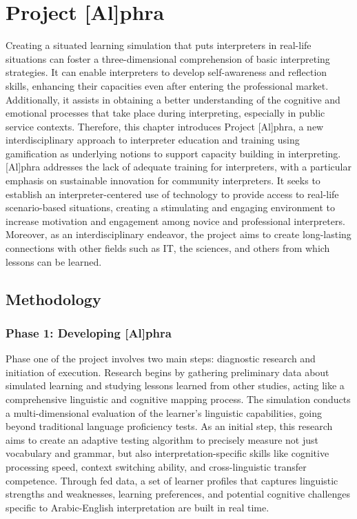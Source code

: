 \documentclass[output=paper]{langscibook}
\begin{document}
\section{Project [Al]phra}

Creating a situated learning simulation that puts interpreters in real-life situations can foster a three-dimensional comprehension of basic interpreting strategies. It can enable interpreters to develop self-awareness and reflection skills, enhancing their capacities even after entering the professional market. Additionally, it assists in obtaining a better understanding of the cognitive and emotional processes that take place during interpreting, especially in public service contexts. Therefore, this chapter introduces Project [Al]phra, a new interdisciplinary approach to interpreter education and training using gamification as underlying notions to support capacity building in interpreting. [Al]phra addresses the lack of adequate training for interpreters, with a particular emphasis on sustainable innovation for community interpreters. It seeks to establish an interpreter-centered use of technology to provide access to real-life scenario-based situations, creating a stimulating and engaging environment to increase motivation and engagement among novice and professional interpreters. Moreover, as an interdisciplinary endeavor, the project aims to create long-lasting connections with other fields such as IT, the sciences, and others from which lessons can be learned.

\subsection{Methodology}
\subsubsection{Phase 1: Developing [Al]phra}

Phase one of the project involves two main steps: diagnostic research and initiation of execution. Research begins by gathering preliminary data about simulated learning and studying lessons learned from other studies, acting like a comprehensive linguistic and cognitive mapping process. The simulation conducts a multi-dimensional evaluation of the learner's linguistic capabilities, going beyond traditional language proficiency tests. As an initial step, this research aims to create an adaptive testing algorithm to precisely measure not just vocabulary and grammar, but also interpretation-specific skills like cognitive processing speed, context switching ability, and cross-linguistic transfer competence. Through fed data, a set of learner profiles that captures linguistic strengths and weaknesses, learning preferences, and potential cognitive challenges specific to Arabic-English interpretation are built in real time.
\end{document}
